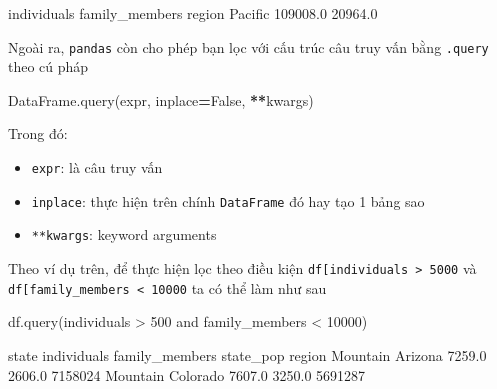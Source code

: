 \documentclass[
]{book}
\newenvironment{Shaded}{\begin{snugshade}}{\end{snugshade}}
\newcommand{\NormalTok}[1]{#1}
\newcommand{\OperatorTok}[1]{\textcolor[rgb]{0.81,0.36,0.00}{\textbf{#1}}}
\newcommand{\StringTok}[1]{\textcolor[rgb]{0.31,0.60,0.02}{#1}}
\newcommand{\VariableTok}[1]{\textcolor[rgb]{0.00,0.00,0.00}{#1}}
\begin{document}
\begin{Shaded}
\begin{Highlighting}[]
\NormalTok{         individuals  family\_members}
\NormalTok{region                              }
\NormalTok{Pacific     109008.0         20964.0}
\end{Highlighting}
\end{Shaded}

Ngoài ra, \texttt{pandas} còn cho phép bạn lọc với cấu trúc câu truy vấn bằng \texttt{.query} theo cú pháp

\begin{Shaded}
\begin{Highlighting}[]
\NormalTok{DataFrame.query(expr, inplace}\OperatorTok{=}\VariableTok{False}\NormalTok{, }\OperatorTok{**}\NormalTok{kwargs)}
\end{Highlighting}
\end{Shaded}

Trong đó:

\begin{itemize}
\item
  \texttt{expr}: là câu truy vấn
\item
  \texttt{inplace}: thực hiện trên chính \texttt{DataFrame} đó hay tạo 1 bảng sao
\item
  \texttt{**kwargs}: keyword arguments
\end{itemize}

Theo ví dụ trên, để thực hiện lọc theo điều kiện \texttt{df{[}\textquotesingle{}individuals\textquotesingle{}{]}\ \textgreater{}\ 5000} và \texttt{df{[}\textquotesingle{}family\_members\textquotesingle{}{]}\ \textless{}\ 10000} ta có thể làm như sau

\begin{Shaded}
\begin{Highlighting}[]
\NormalTok{df.query(}\StringTok{\textquotesingle{}individuals \textgreater{} 500 and family\_members \textless{} 10000\textquotesingle{}}\NormalTok{)}
\end{Highlighting}
\end{Shaded}

\begin{Shaded}
\begin{Highlighting}[]
\NormalTok{             state  individuals  family\_members  state\_pop}
\NormalTok{region                                                    }
\NormalTok{Mountain   Arizona       7259.0          2606.0    7158024}
\NormalTok{Mountain  Colorado       7607.0          3250.0    5691287}
\end{Highlighting}
\end{Shaded}
\end{document}
